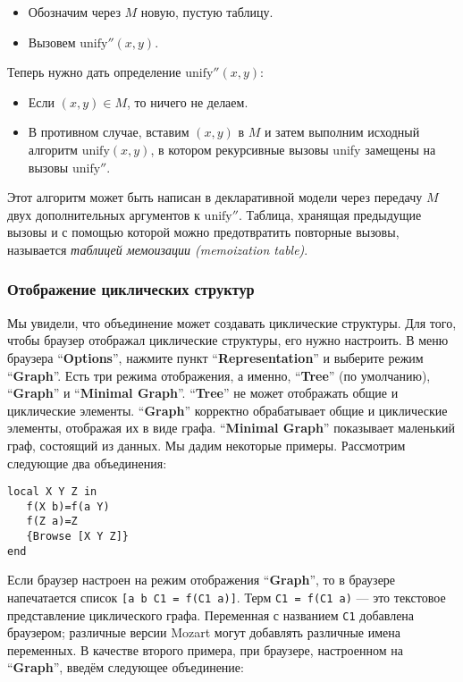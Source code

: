 \begin{itemize}
\item{Обозначим через $M$ новую, пустую таблицу.}

\item{Вызовем $\text{unify}''(x, y)$.}
\end{itemize}

Теперь нужно дать определение $\text{unify}''(x, y)$:

\begin{itemize}
  
\item{Если $(x, y) \in M$, то ничего не делаем.}

\item{В противном случае, вставим $(x, y)$ в $M$ и затем выполним исходный алгоритм $\text{unify}(x, y)$, в котором рекурсивные вызовы unify замещены на вызовы $\text{unify}''$.}
\end{itemize}

Этот алгоритм может быть написан в декларативной модели через передачу $M$ двух дополнительных аргументов к $\text{unify}''$. Таблица, хранящая предыдущие вызовы и с помощью которой можно предотвратить повторные вызовы, называется \emph{таблицей мемоизации (memoization table)}.

\subsubsection{Отображение циклических структур}

Мы увидели, что объединение может создавать циклические структуры. Для того, чтобы браузер отображал циклические структуры, его нужно настроить. В меню браузера ``\textbf{Options}'', нажмите пункт ``\textbf{{Representation}}'' и выберите режим ``\textbf{Graph}''. Есть три режима отображения, а именно, ``\textbf{Tree}'' (по умолчанию), ``\textbf{Graph}'' и ``\textbf{Minimal Graph}''. ``\textbf{Tree}'' не может отображать общие и циклические элементы. ``\textbf{Graph}'' корректно обрабатывает общие и циклические элементы, отображая их в виде графа. ``\textbf{Minimal Graph}'' показывает маленький граф, состоящий из данных. Мы дадим некоторые примеры. Рассмотрим следующие два объединения:

\begin{lstlisting}
local X Y Z in
   f(X b)=f(a Y)
   f(Z a)=Z
   {Browse [X Y Z]}
end
\end{lstlisting}

Если браузер настроен на режим отображения ``\textbf{Graph}'', то в браузере напечатается список \lstinline![a b C1 = f(C1 a)]!. Терм \lstinline!C1 = f(C1 a)! --- это текстовое представление циклического графа. Переменная с названием \lstinline!C1! добавлена браузером; различные версии Mozart могут добавлять различные имена переменных. В качестве второго примера, при браузере, настроенном на ``\textbf{Graph}'', введём следующее объединение:

